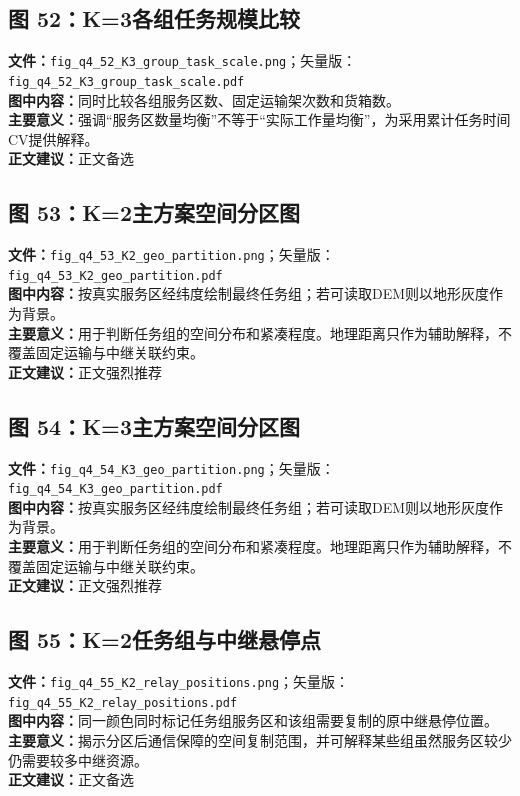 \subsection*{图 52：K=3各组任务规模比较}
\textbf{文件：}\texttt{fig\_q4\_52\_K3\_group\_task\_scale.png}；矢量版：\texttt{fig\_q4\_52\_K3\_group\_task\_scale.pdf}\\
\textbf{图中内容：}同时比较各组服务区数、固定运输架次数和货箱数。\\
\textbf{主要意义：}强调“服务区数量均衡”不等于“实际工作量均衡”，为采用累计任务时间CV提供解释。\\
\textbf{正文建议：}正文备选

\subsection*{图 53：K=2主方案空间分区图}
\textbf{文件：}\texttt{fig\_q4\_53\_K2\_geo\_partition.png}；矢量版：\texttt{fig\_q4\_53\_K2\_geo\_partition.pdf}\\
\textbf{图中内容：}按真实服务区经纬度绘制最终任务组；若可读取DEM则以地形灰度作为背景。\\
\textbf{主要意义：}用于判断任务组的空间分布和紧凑程度。地理距离只作为辅助解释，不覆盖固定运输与中继关联约束。\\
\textbf{正文建议：}正文强烈推荐

\subsection*{图 54：K=3主方案空间分区图}
\textbf{文件：}\texttt{fig\_q4\_54\_K3\_geo\_partition.png}；矢量版：\texttt{fig\_q4\_54\_K3\_geo\_partition.pdf}\\
\textbf{图中内容：}按真实服务区经纬度绘制最终任务组；若可读取DEM则以地形灰度作为背景。\\
\textbf{主要意义：}用于判断任务组的空间分布和紧凑程度。地理距离只作为辅助解释，不覆盖固定运输与中继关联约束。\\
\textbf{正文建议：}正文强烈推荐

\subsection*{图 55：K=2任务组与中继悬停点}
\textbf{文件：}\texttt{fig\_q4\_55\_K2\_relay\_positions.png}；矢量版：\texttt{fig\_q4\_55\_K2\_relay\_positions.pdf}\\
\textbf{图中内容：}同一颜色同时标记任务组服务区和该组需要复制的原中继悬停位置。\\
\textbf{主要意义：}揭示分区后通信保障的空间复制范围，并可解释某些组虽然服务区较少仍需要较多中继资源。\\
\textbf{正文建议：}正文备选

